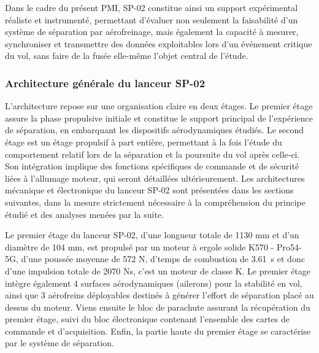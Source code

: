 Dans le cadre du présent PMI, SP-02 constitue ainsi un support expérimental réaliste et instrumenté, permettant d’évaluer non
seulement la faisabilité d’un système de séparation par aérofreinage, mais également la capacité à mesurer, synchroniser et
transmettre des données exploitables lors d’un événement critique du vol, sans faire de la fusée elle-même l’objet central de
l’étude.

\subsubsection{Architecture générale du lanceur SP-02}

L’architecture repose sur une organisation claire en deux étages. Le premier étage assure la phase propulsive initiale et
constitue le support principal de l’expérience de séparation, en embarquant les dispositifs aérodynamiques étudiés. Le second
étage est un étage propulsif à part entière, permettant à la fois l’étude du comportement relatif lors de la séparation et la
poursuite du vol après celle-ci. Son intégration implique des fonctions spécifiques de commande et de sécurité liées à l’allumage
moteur, qui seront détaillées ultérieurement. Les architectures mécanique et électronique du lanceur SP-02 sont présentées dans
les sections suivantes, dans la mesure strictement nécessaire à la compréhension du principe étudié et des analyses menées par
la suite.


Le premier étage du lanceur SP-02, d’une longueur totale de 1130 mm et d’un diamètre de 104 mm, est propulsé par un moteur
à ergole solide K570 - Pro54-5G, d'une poussée moyenne de 572 N, d'temps de combustion de 3.61~s et donc d'une impulsion totale de
2070 Ns, c'est un moteur de classe K. Le premier étage intègre également 4 surfaces aérodynamiques (ailerons) pour la stabilité en
vol, ainsi que 3 aérofreins déployables destinés à générer l’effort de séparation placé au dessus du moteur. Viens ensuite le bloc
de parachute assurant la récupération du premier étage, suivi du bloc électronique contenant l’ensemble des cartes de commande et
d’acquisition. Enfin, la partie haute du premier étage se caractérise par le système de séparation.


